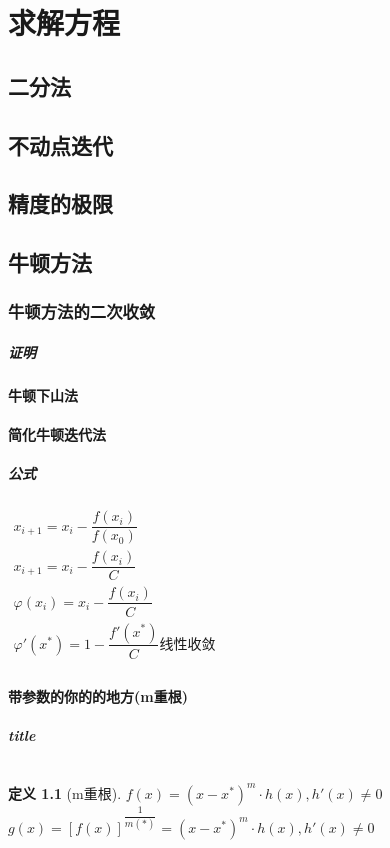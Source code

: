 \documentclass[UTF8,a4paper,12pt,scheme=chinese]{ctexbook}
\theoremstyle{plain}
\newtheorem{definition}{定义}[section]
\begin{document}
	\chapter{求解方程}
	\section{二分法}
	\section{不动点迭代}
	\section{精度的极限}
	\section{牛顿方法}
	\subsection{牛顿方法的二次收敛}
	\paragraph{证明}
	\subsubsection{牛顿下山法}
	\subsubsection{简化牛顿迭代法}
	\paragraph{公式}$
	\begin{array}{l}
	x_{i+1}=x_i-\dfrac{f(x_i)}{f(x_0)}\\
	x_{i+1}=x_i-\dfrac{f(x_i)}{C}\\
	\varphi(x_{i})=x_i-\dfrac{f(x_i)}{C}\\
	\varphi'(x^*)=1-\dfrac{f'(x^*)}{C}\mbox{线性收敛}\\
	\end{array} 
	$
	\subsubsection{带参数的你的的地方(m重根)}
	\paragraph{title}$  $
	\begin{definition}[m重根]
		$ f(x)=(x-x^*)^m\cdot h(x),h'(x)\neq0 $\\
		$ g(x)=[f(x)]^{\dfrac{1}{m(*)}}=(x-x^*)^m\cdot h(x),h'(x)\neq0 $
		
	\end{definition}
\end{document}
